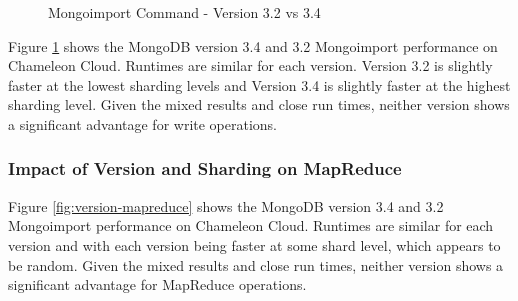 \documentclass[sigconf]{acmart}
\begin{document}
\begin{figure}[htbp]
\centering
{}
\caption{Mongoimport Command - Version 3.2 vs 3.4}
\label{fig:version-import}
\end{figure}


Figure \ref{fig:version-import} shows the MongoDB version 3.4 and 3.2
Mongoimport performance on Chameleon Cloud. Runtimes are similar for
each version.  Version 3.2 is slightly faster at the lowest sharding
levels and Version 3.4 is slightly faster at the highest sharding
level.  Given the mixed results and close run times, neither version
shows a significant advantage for write operations.


\subsubsection{Impact of Version and Sharding on MapReduce}

Figure \ref{fig:version-mapreduce} shows the MongoDB version 3.4 and
3.2 Mongoimport performance on Chameleon Cloud.  Runtimes are similar
for each version and with each version being faster at some shard
level, which appears to be random. Given the mixed results and close
run times, neither version shows a significant advantage for MapReduce
operations.
\end{document}
